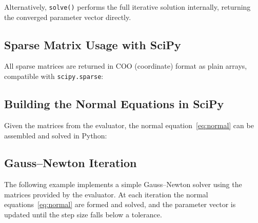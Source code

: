 \documentclass[a4paper,11pt]{article}
\newcommand{\code}[1]{\texttt{#1}}
\begin{document}
Alternatively, \code{solve()} performs the full iterative solution
internally, returning the converged parameter vector directly.



\subsection{Sparse Matrix Usage with SciPy}
\label{sec:sparse}

All sparse matrices are returned in COO (coordinate) format as plain
arrays, compatible with \code{scipy.sparse}:



\subsection{Building the Normal Equations in SciPy}
\label{sec:normal}

Given the matrices from the evaluator, the normal
equation~\eqref{eq:normal} can be assembled and solved in Python:



\subsection{Gauss--Newton Iteration}
\label{sec:gn}

The following example implements a simple Gauss--Newton solver using
the matrices provided by the evaluator. At each iteration the normal
equations~\eqref{eq:normal} are formed and solved, and the parameter
vector is updated until the step size falls below a tolerance.
\end{document}
